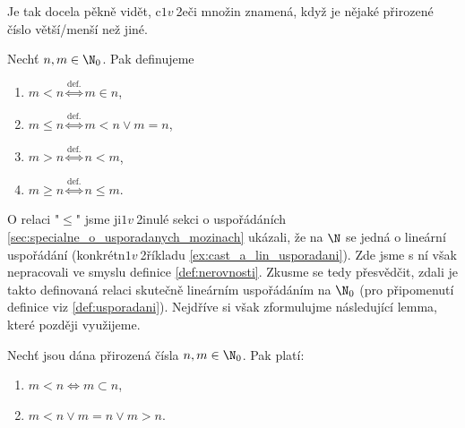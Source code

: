 Je tak docela pěkně vidět, c$1 v~$2eči množin znamená, když je nějaké přirozené číslo větší/menší než jiné.
\begin{definition}\label{def:nerovnosti}
    Nechť $n,m\in\N_0$. Pak definujeme
    \begin{enumerate}[label=(\roman*)]
        \item $m<n\stackrel{\text{def.}}{\iff}m\in n$,
        \item $m\leq n\stackrel{\text{def.}}{\iff}m<n\lor m=n$,
        \item $m>n\stackrel{\text{def.}}{\iff}n<m$,
        \item $m\geq n\stackrel{\text{def.}}{\iff}n\leq m$.
    \end{enumerate}
\end{definition}
O relaci "$\leq$" jsme ji$1 v~$2inulé sekci o uspořádáních \ref{sec:specialne_o_usporadanych_mozinach} ukázali, že na $\N$ se jedná o lineární uspořádání (konkrétn$1 v~$2říkladu \ref{ex:cast_a_lin_usporadani}). Zde jsme s ní však nepracovali ve smyslu definice \ref{def:nerovnosti}. Zkusme se tedy přesvědčit, zdali je takto definovaná relaci skutečně lineárním uspořádáním na $\N_0$ (pro připomenutí definice viz \ref{def:usporadani}). Nejdříve si však zformulujme následující lemma, které později využijeme.
\begin{lemma}\label{lem:vlastnosti_prirozenych_cisel_2}
    Nechť jsou dána přirozená čísla $n,m\in\N_0$. Pak platí:
    \begin{enumerate}[label=(\roman*)]
        \item\label{item:vlastnost_2_1} $m<n\iff m\subset n$,
        \item\label{item:vlastnost_2_2} $m<n \lor m=n \lor m>n$.
    \end{enumerate}
\end{lemma}
